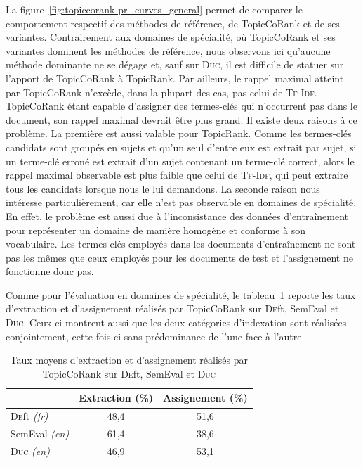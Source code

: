         La figure~\ref{fig:topiccorank-pr_curves_general} permet de comparer le
        comportement respectif des méthodes de référence, de TopicCoRank et de
        ses variantes. Contrairement aux domaines de spécialité, où TopicCoRank
        et ses variantes dominent les méthodes de référence, nous observons ici
        qu'aucune méthode dominante ne se dégage et, sauf sur \textsc{Duc}, il
        est difficile de statuer sur l'apport de TopicCoRank à TopicRank. Par
        ailleurs, le rappel maximal atteint par TopicCoRank n'excède, dans la
        plupart des cas, pas celui de \textsc{Tf-Idf}. TopicCoRank étant capable
        d'assigner des termes-clés qui n'occurrent pas dans le document, son
        rappel maximal devrait être plus grand. Il existe deux raisons à ce
        problème. La première est aussi valable pour TopicRank. Comme les
        termes-clés candidats sont groupés en sujets et qu'un seul d'entre eux
        est extrait par sujet, si un terme-clé erroné est extrait d'un sujet
        contenant un terme-clé correct, alors le rappel maximal observable est
        plus faible que celui de \textsc{Tf-Idf}, qui peut extraire tous les
        candidats lorsque nous le lui demandons. La seconde raison nous
        intéresse particulièrement, car elle n'est pas observable en domaines de
        spécialité. En effet, le problème est aussi due à l'inconsistance des
        données d'entraînement pour représenter un \og{}domaine\fg{} de manière
        homogène et conforme à son vocabulaire. Les termes-clés employés dans
        les documents d'entraînement ne sont pas les mêmes que ceux employés
        pour les documents de test et l'assignement ne fonctionne donc pas.
        

        Comme pour l'évaluation en domaines de spécialité, le
        tableau~\ref{tab:assignment_ratio_general} reporte les taux d'extraction
        et d'assignement réalisés par TopicCoRank sur \textsc{De}ft, SemEval et
        \textsc{Duc}. Ceux-ci montrent aussi que les deux catégories
        d'indexation sont réalisées conjointement, cette fois-ci sans
        prédominance de l'une face à l'autre.
        \begin{table}[h]
          \centering
          \begin{tabular}{l|c|c}
              \toprule
              & Extraction (\%) & Assignement (\%)\\
              \hline
              \textsc{De}ft \textit{(fr)} & 48,4 & 51,6\\
              SemEval \textit{(en)} & 61,4 & 38,6\\
              \textsc{Duc} \textit{(en)} & 46,9 & 53,1\\
              \bottomrule
          \end{tabular}
          \caption{Taux moyens d'extraction et d'assignement réalisés par
                   TopicCoRank sur \textsc{De}ft, SemEval et \textsc{Duc}
                   \label{tab:assignment_ratio_general}}
        \end{table}


